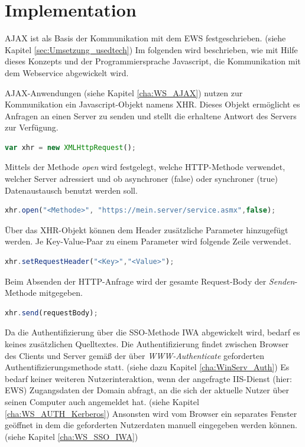\pagebreak

\section{Implementation}
\label{cha:Umsetzung_JS_XHR}
\ac{AJAX} ist als Basis der Kommunikation mit dem \ac{EWS} festgeschrieben. (siehe Kapitel \ref{sec:Umsetzung_usedtech}) Im folgenden wird beschrieben, wie mit Hilfe dieses Konzepts und der Programmiersprache Javascript, die Kommunikation mit dem Webservice abgewickelt wird.

\ac{AJAX}-Anwendungen (siehe Kapitel \ref{cha:WS_AJAX}) nutzen zur Kommunikation ein Javascript-Objekt namens \ac{XHR}. Dieses Objekt ermöglicht es Anfragen an einen Server zu senden und stellt die erhaltene Antwort des Servers zur Verfügung.

\begin{lstlisting}[language=JavaScript] 
var xhr = new XMLHttpRequest();
\end{lstlisting}

Mittels der Methode \emph{open} wird festgelegt, welche \ac{HTTP}-Methode verwendet, welcher Server adressiert und ob asynchroner (false) oder synchroner (true) Datenaustausch benutzt werden soll.

\begin{lstlisting}[language=JavaScript] 
xhr.open("<Methode>", "https://mein.server/service.asmx",false);
\end{lstlisting}

Über das \ac{XHR}-Objekt können dem Header zusätzliche Parameter hinzugefügt werden. Je Key-Value-Paar zu einem Parameter wird folgende Zeile verwendet.

\begin{lstlisting}[language=JavaScript] 
xhr.setRequestHeader("<Key>","<Value>");
\end{lstlisting}

Beim Absenden der \ac{HTTP}-Anfrage wird der gesamte Request-Body der \emph{Senden}-Methode mitgegeben.

\begin{lstlisting}[language=JavaScript] 
xhr.send(requestBody);
\end{lstlisting}

Da die Authentifizierung über die \ac{SSO}-Methode \ac{IWA} abgewickelt wird, bedarf es keines zusätzlichen Quelltextes. Die Authentifizierung findet zwischen Browser des Clients und Server gemäß der über \emph{WWW-Authenticate} geforderten Authentifizierungsmethode statt. (siehe dazu Kapitel \ref{cha:WinServ_Auth}) Es bedarf keiner weiteren Nutzerinteraktion, wenn der angefragte \ac{IIS}-Dienst (hier: \ac{EWS}) Zugangsdaten der Domain abfragt, an die sich der aktuelle Nutzer über seinen Computer auch angemeldet hat. (siehe Kapitel \ref{cha:WS_AUTH_Kerberos}) Ansonsten wird vom Browser ein separates Fenster geöffnet in dem die geforderten Nutzerdaten manuell eingegeben werden können. (siehe Kapitel \ref{cha:WS_SSO_IWA})

